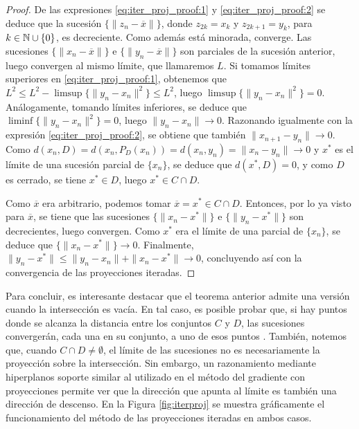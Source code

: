 \begin{proof}
    De las expresiones \ref{eq:iter_proj_proof:1} y \ref{eq:iter_proj_proof:2} se deduce que la sucesión $\{\|z_n - \overline{x}\|\}$, donde $z_{2k} = x_k$ y $z_{2k+1} = y_k$, para $k \in \mathbb{N} \cup\{0\}$, es decreciente. Como además está minorada, converge. Las sucesiones $\{\|x_n - \overline{x}\|\}$ e $\{\|y_n - \overline{x}\|\}$ son parciales de la sucesión anterior, luego convergen al mismo límite, que llamaremos $L$. Si tomamos límites superiores en \ref{eq:iter_proj_proof:1}, obtenemos que $L^2 \le L^2 - \limsup\{\|y_n - x_n\|^2\} \le L^2$, luego $\limsup\{\|y_n - x_n\|^2\} = 0$. Análogamente, tomando límites inferiores, se deduce que $\liminf\{\|y_n - x_n\|^2\} = 0$, luego $\|y_n - x_n \| \to 0$. Razonando igualmente con la expresión \ref{eq:iter_proj_proof:2}, se obtiene que también $\|x_{n+1} - y_n\| \to 0$. Como $d(x_n,D) = d(x_n,P_D(x_n)) = d(x_n,y_n) = \|x_n - y_n \| \to 0$ y $x^*$ es el límite de una sucesión parcial de $\{x_n\}$, se deduce que $d(x^*,D) = 0$, y como $D$ es cerrado, se tiene $x^* \in D$, luego $x^* \in C\cap D$.

    Como $\overline{x}$ era arbitrario, podemos tomar $\overline{x} = x^* \in C\cap D$. Entonces, por lo ya visto para $\overline{x}$, se tiene que las sucesiones $\{\|x_n - x^*\|\}$ e $\{\|y_n - x^*\|\}$ son decrecientes, luego convergen. Como $x^*$ era el límite de una parcial de $\{x_n\}$, se deduce que $\{\|x_n - x^*\|\} \to 0$. Finalmente, $\|y_n - x^*\| \le \|y_n - x_n\| + \|x_n - x^*\| \to 0$, concluyendo así con la convergencia de las proyecciones iteradas.

\end{proof}

Para concluir, es interesante destacar que el teorema anterior admite una versión cuando la intersección es vacía. En tal caso, es posible probar que, si hay puntos donde se alcanza la distancia entre los conjuntos $C$ y $D$, las sucesiones convergerán, cada una en su conjunto, a uno de esos puntos \cite{proximity_convex}. También, notemos que, cuando $C \cap D \ne \emptyset$, el límite de las sucesiones no es necesariamente la proyección sobre la intersección. Sin embargo, un razonamiento mediante hiperplanos soporte similar al utilizado en el método del gradiente con proyecciones permite ver que la dirección que apunta al límite es también una dirección de descenso. En la Figura \ref{fig:iterproj} se muestra gráficamente el funcionamiento del método de las proyecciones iteradas en ambos casos.

